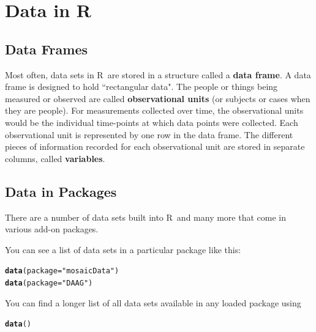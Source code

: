 \documentclass[twoside]{book}\usepackage[]{graphicx}\usepackage[]{xcolor}
\makeatletter
\newcommand{\hlstr}[1]{\textcolor[rgb]{0.192,0.494,0.8}{#1}}%
\newcommand{\hlstd}[1]{\textcolor[rgb]{0.345,0.345,0.345}{#1}}%
\newcommand{\hlkwc}[1]{\textcolor[rgb]{0.333,0.667,0.333}{#1}}%
\newcommand{\hlkwd}[1]{\textcolor[rgb]{0.737,0.353,0.396}{\textbf{#1}}}%
\newenvironment{kframe}{%
 \def\at@end@of@kframe{}%
 \ifinner\ifhmode%
  \def\at@end@of@kframe{\end{minipage}}%
  \begin{minipage}{\columnwidth}%
 \fi\fi%
 \def\FrameCommand##1{\hskip\@totalleftmargin \hskip-\fboxsep
 \colorbox{shadecolor}{##1}\hskip-\fboxsep
     \hskip-\linewidth \hskip-\@totalleftmargin \hskip\columnwidth}%
 \MakeFramed {\advance\hsize-\width
   \@totalleftmargin\z@ \linewidth\hsize
   \@setminipage}}%
 {\par\unskip\endMakeFramed%
 \at@end@of@kframe}
\newenvironment{knitrout}{}{} %
\def\R{{\sf R}}
\def\term#1{\textbf{#1}}
\makeatother
\begin{document}
\section{Data in \R}

\subsection{Data Frames}
Most often, data sets in \R\ are stored in a structure called a 
\term{data frame}.  A data frame is designed to hold ``rectangular data".  The people or things
being measured or observed are called \term{observational units} (or subjects or cases when 
they are people).  For measurements collected over time, the observational units would be the individual 
time-points at which data points were collected. Each observational unit is represented by one row in the data frame.
The different pieces of information recorded for each observational unit are stored in
separate columns, called \term{variables}.  

\subsection{Data in Packages}
There are a number of data sets built into \R\
and many more that come in various add-on packages.  

You can see a list of data sets in a particular package like this:
\begin{knitrout}
\color{fgcolor}\begin{kframe}
\begin{alltt}
\hlkwd{data}\hlstd{(}\hlkwc{package}\hlstd{=}\hlstr{"mosaicData"}\hlstd{)}
\hlkwd{data}\hlstd{(}\hlkwc{package}\hlstd{=}\hlstr{"DAAG"}\hlstd{)}
\end{alltt}
\end{kframe}
\end{knitrout}

You can find a longer list of all data sets available in any loaded package
using 
\begin{knitrout}
\color{fgcolor}\begin{kframe}
\begin{alltt}
\hlkwd{data}\hlstd{()}
\end{alltt}
\end{kframe}
\end{knitrout}
\end{document}
